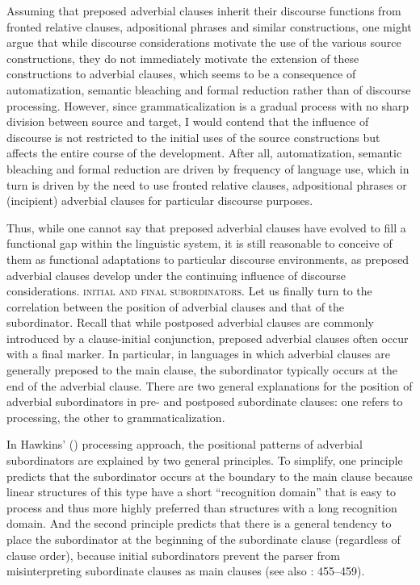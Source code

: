 \documentclass[output=paper]{langsci/langscibook}
\begin{document}
Assuming that preposed adverbial clauses inherit their discourse functions from fronted relative clauses, adpositional phrases and similar constructions, one might argue that while discourse considerations motivate the use of the various source constructions, they do not immediately motivate the extension of these constructions to adverbial clauses, which 
\label{p:xxx:automatization}
seems to be a consequence of automatization, semantic bleaching and formal reduction rather than of discourse processing. However, since grammaticalization is a gradual process with no sharp division between source and target, I would contend that the influence of discourse is not restricted to the initial uses of the source constructions but affects the entire course of the development. After all, automatization, semantic bleaching and formal reduction are driven by frequency of language use, which in turn is driven by the need to use fronted relative clauses, adpositional phrases or (incipient) adverbial clauses for particular discourse purposes.

Thus, while one cannot say that preposed adverbial clauses have evolved to fill a functional gap within the linguistic system, it is still reasonable to conceive of them as functional adaptations to particular discourse environments, as preposed adverbial clauses develop under the continuing influence of discourse considerations.
\newpage
\textsc{initial} \textsc{and} \textsc{final} \textsc{subordinators}. Let us finally turn to the correlation between the position of adverbial clauses and that of the subordinator. Recall that while postposed adverbial clauses are commonly introduced by a clause-initial conjunction, preposed adverbial clauses often occur with a final marker. In particular, in languages in which adverbial clauses are generally preposed to the main clause, the subordinator typically occurs at the end of the adverbial clause. There are two general explanations for the position of adverbial subordinators in pre- and postposed subordinate clauses: one refers to processing, the other to grammaticalization.

In Hawkins’ (\citeyear{Hawkins1994,Hawkins2004}) processing approach, the positional patterns of adverbial subordinators are explained by two general principles. To simplify, one principle predicts that the subordinator occurs at the boundary to the main clause because linear structures of this type have a short “recognition domain” that is easy to process and thus more highly preferred than structures with a long recognition domain. And the second principle predicts that there is a general tendency to place the subordinator at the beginning of the subordinate clause (regardless of clause order), because initial subordinators prevent the parser from misinterpreting subordinate clauses as main clauses (see also \citealt{Diessel2005}: 455--459).
\end{document}
